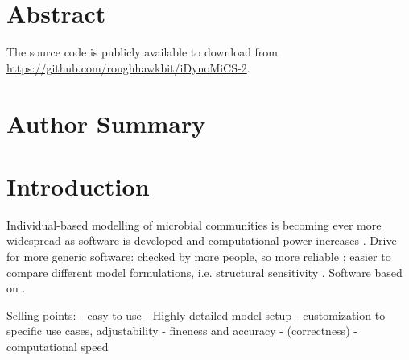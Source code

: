 \documentclass[10pt,letterpaper]{article}
\begin{document}
\section*{Abstract}


The source code is publicly available to download from \url{https://github.com/roughhawkbit/iDynoMiCS-2}.

\section*{Author Summary}

\linenumbers

\section*{Introduction}
Individual-based modelling of microbial communities is becoming ever more widespread as software is developed and computational power increases \cite{Ferrer2008}.
Drive for more generic software:
checked by more people, so more reliable \cite{Joppa2013};
easier to compare different model formulations, i.e. structural sensitivity \cite{adamson2013}.
Software based on \cite{Kreft1998, Lardon2011}.


Selling points: 
- easy to use
- Highly detailed model setup
- customization to specific use cases, adjustability 
- fineness and accuracy
- (correctness) %
- computational speed %

\end{document}
